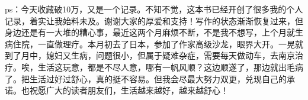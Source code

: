 \begin{this_body}
ps：今天收藏破10万，又是一个记录。不知不觉，这本书已经开创了很多我的个人记录，着实让我始料未及。谢谢大家的厚爱和支持！写作的状态渐渐恢复过来，但身边还是有一大堆的糟心事，最近这两个月麻烦不断，不是我不想写，上个月就生病住院，一直做理疗。本月初去了日本，参加了作家高级沙龙，眼界大开。一晃就到了月中，媳妇又生病，问题很小，但属于疑难杂症，需要每天做动车，去南京治疗。唉，生活这玩意，都是不尽人意，哪有一帆风顺？这边顺遂了，那边就出毛病了。把生活过好过舒心，真的挺不容易。但我会尽最大努力双更，兑现自己的承诺。也祝愿广大的读者朋友们，生活越来越好，越来越舒心！

\end{this_body}

